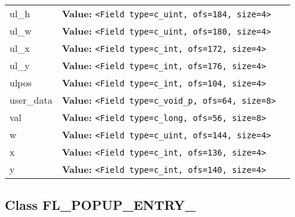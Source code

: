 \begin{longtable}{|p{\varnamewidth}|p{\vardescrwidth}|l}
\cline{1-2}
\raggedright u\-l\-\_\-h\- & \raggedright \textbf{Value:} 
{\tt {\textless}Field type=c\_uint, ofs=184, size=4{\textgreater}}&\\
\cline{1-2}
\raggedright u\-l\-\_\-w\- & \raggedright \textbf{Value:} 
{\tt {\textless}Field type=c\_uint, ofs=180, size=4{\textgreater}}&\\
\cline{1-2}
\raggedright u\-l\-\_\-x\- & \raggedright \textbf{Value:} 
{\tt {\textless}Field type=c\_int, ofs=172, size=4{\textgreater}}&\\
\cline{1-2}
\raggedright u\-l\-\_\-y\- & \raggedright \textbf{Value:} 
{\tt {\textless}Field type=c\_int, ofs=176, size=4{\textgreater}}&\\
\cline{1-2}
\raggedright u\-l\-p\-o\-s\- & \raggedright \textbf{Value:} 
{\tt {\textless}Field type=c\_int, ofs=104, size=4{\textgreater}}&\\
\cline{1-2}
\raggedright u\-s\-e\-r\-\_\-d\-a\-t\-a\- & \raggedright \textbf{Value:} 
{\tt {\textless}Field type=c\_void\_p, ofs=64, size=8{\textgreater}}&\\
\cline{1-2}
\raggedright v\-a\-l\- & \raggedright \textbf{Value:} 
{\tt {\textless}Field type=c\_long, ofs=56, size=8{\textgreater}}&\\
\cline{1-2}
\raggedright w\- & \raggedright \textbf{Value:} 
{\tt {\textless}Field type=c\_uint, ofs=144, size=4{\textgreater}}&\\
\cline{1-2}
\raggedright x\- & \raggedright \textbf{Value:} 
{\tt {\textless}Field type=c\_int, ofs=136, size=4{\textgreater}}&\\
\cline{1-2}
\raggedright y\- & \raggedright \textbf{Value:} 
{\tt {\textless}Field type=c\_int, ofs=140, size=4{\textgreater}}&\\
\cline{1-2}
\end{longtable}



\subsection{Class FL\_POPUP\_ENTRY\_}

